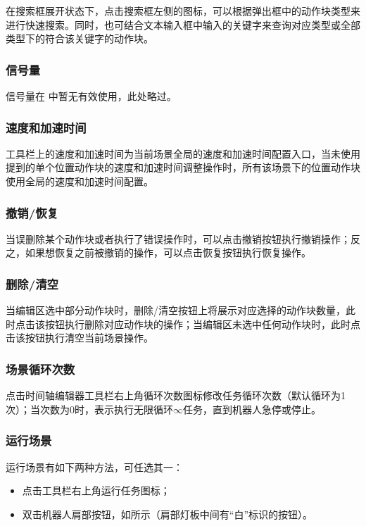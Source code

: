 在搜索框展开状态下，点击搜索框左侧的图标，可以根据弹出框中的动作块类型来进行快速搜索。同时，也可结合文本输入框中输入的关键字来查询对应类型或全部类型下的符合该关键字的动作块。
\subsubsection{信号量}
信号量在 中暂无有效使用，此处略过。
\subsubsection{速度和加速时间}
\label{sec:速度和加速时间}
工具栏上的速度和加速时间为当前场景全局的速度和加速时间配置入口，当未使用提到的单个位置动作块的速度和加速时间调整操作时，所有该场景下的位置动作块使用全局的速度和加速时间配置。
\subsubsection{撤销/恢复}
当误删除某个动作块或者执行了错误操作时，可以点击撤销按钮执行撤销操作；反之，如果想恢复之前被撤销的操作，可以点击恢复按钮执行恢复操作。

\subsubsection{删除/清空}
当编辑区选中部分动作块时，删除/清空按钮上将展示对应选择的动作块数量，此时点击该按钮执行删除对应动作块的操作；当编辑区未选中任何动作块时，此时点击该按钮执行清空当前场景操作。

\subsubsection{场景循环次数}
点击时间轴编辑器工具栏右上角循环次数图标修改任务循环次数（默认循环为1次）；当次数为0时，表示执行无限循环$\infty$任务，直到机器人急停或停止。
\subsubsection{运行场景}
\label{sec:运行场景}
运行场景有如下两种方法，可任选其一：
\begin{itemize}
	\item 点击工具栏右上角运行任务图标；
	\item 双击机器人肩部按钮，如所示（肩部灯板中间有“白”标识的按钮）。
\end{itemize}

